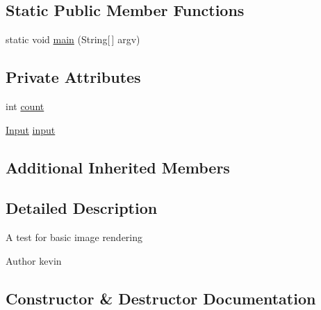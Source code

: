 \subsection*{Static Public Member Functions}
\begin{DoxyCompactItemize}
\item 
static void \mbox{\hyperlink{classorg_1_1newdawn_1_1slick_1_1tests_1_1_key_repeat_test_acdaa80172b8d571548a1c5e9d170465e}{main}} (String\mbox{[}$\,$\mbox{]} argv)
\end{DoxyCompactItemize}
\subsection*{Private Attributes}
\begin{DoxyCompactItemize}
\item 
int \mbox{\hyperlink{classorg_1_1newdawn_1_1slick_1_1tests_1_1_key_repeat_test_a907835f32f42f9cf166da563119cff0b}{count}}
\item 
\mbox{\hyperlink{classorg_1_1newdawn_1_1slick_1_1_input}{Input}} \mbox{\hyperlink{classorg_1_1newdawn_1_1slick_1_1tests_1_1_key_repeat_test_ae6cb084c8595eb389b674bce147bd4ea}{input}}
\end{DoxyCompactItemize}
\subsection*{Additional Inherited Members}


\subsection{Detailed Description}
A test for basic image rendering

\begin{DoxyAuthor}{Author}
kevin 
\end{DoxyAuthor}


\subsection{Constructor \& Destructor Documentation}
\mbox{\label{classorg_1_1newdawn_1_1slick_1_1tests_1_1_key_repeat_test_afc09547e4d3e13751ea34732a0c23975}} 
